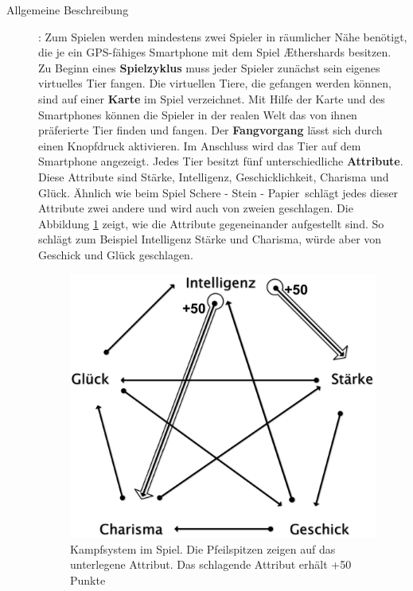 \begin{description}
\item [Allgemeine Beschreibung]: 
Zum Spielen werden mindestens zwei Spieler in räumlicher Nähe benötigt, die je ein GPS-fähiges Smartphone mit dem Spiel Æthershards besitzen. Zu Beginn eines \textbf{Spielzyklus} muss jeder Spieler zunächst sein eigenes virtuelles Tier fangen. Die virtuellen Tiere, die gefangen werden können, sind auf einer \textbf{Karte} im Spiel verzeichnet. Mit Hilfe der Karte und des Smartphones können die Spieler in der realen Welt das von ihnen präferierte Tier finden und fangen. Der \textbf{Fangvorgang} lässt sich durch einen Knopfdruck aktivieren. Im Anschluss wird das Tier auf dem Smartphone angezeigt. Jedes Tier besitzt fünf unterschiedliche \textbf{Attribute}. Diese Attribute sind Stärke, Intelligenz, Geschicklichkeit, Charisma und Glück. Ähnlich wie beim Spiel \glqq Schere - Stein - Papier\grqq\, schlägt jedes dieser Attribute zwei andere und wird auch von zweien geschlagen. Die Abbildung \ref{pic:ASSkills} zeigt, wie die Attribute gegeneinander aufgestellt sind. So schlägt zum Beispiel Intelligenz Stärke und Charisma, würde aber von Geschick und Glück geschlagen. \\

\begin{figure}[H]
    \centering
    \includegraphics[width=.6\textwidth]{files/as/skillsPlus}
    \caption{Kampfsystem im Spiel. Die Pfeilspitzen zeigen auf das unterlegene Attribut. Das schlagende Attribut erhält +50 Punkte}
    \label{pic:ASSkills}
\end{figure}
     

\end{description}
